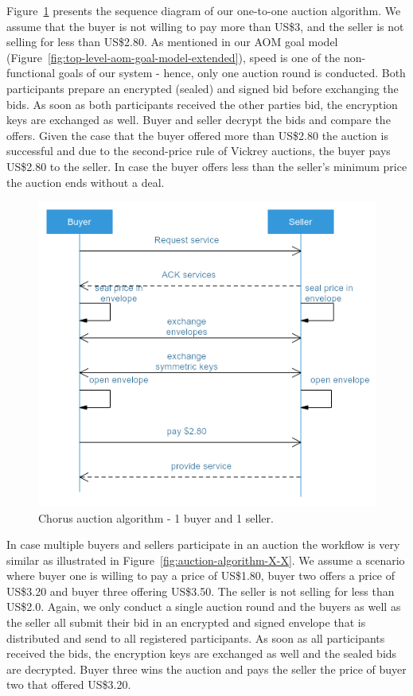 \documentclass{llncs}
\begin{document}
{			Figure~\ref{fig:auction-algorithm-1-1} presents the sequence diagram of our one-to-one auction algorithm. We assume that the buyer is not willing to pay more than US\$3, and the seller is not selling for less than US\$2.80. As mentioned in our AOM goal model (Figure~\ref{fig:top-level-aom-goal-model-extended}), speed is one of the non-functional goals of our system - hence, only one auction round is conducted.  Both participants prepare an encrypted (sealed) and signed bid before exchanging the bids. As soon as both participants received the other parties bid, the encryption keys are exchanged as well. Buyer and seller decrypt the bids and compare the offers. Given the case that the buyer offered more than US\$2.80 the auction is successful and due to the second-price rule of Vickrey auctions, the buyer pays US\$2.80 to the seller. In case the buyer offers less than the seller's minimum price the auction ends without a deal.	
			\begin{figure}
				\centering
				\includegraphics[scale=0.54]{Figures/auction/20180501_auction-aglorithms--1-to-1.png}
				\caption{Chorus auction algorithm - 1 buyer and 1 seller.}	
				\label{fig:auction-algorithm-1-1}
			\end{figure}
			In case multiple buyers and sellers participate in an auction the workflow is very similar as illustrated in Figure~\ref{fig:auction-algorithm-X-X}. We assume a scenario where buyer one is willing to pay a price of US\$1.80, buyer two offers a price of US\$3.20 and buyer three offering US\$3.50. The seller is not selling for less than US\$2.0. Again, we only conduct a single auction round and the buyers as well as the seller all submit their bid in an encrypted and signed envelope that is distributed and send to all registered participants. As soon as all participants received the bids, the encryption keys are exchanged as well and the sealed bids are decrypted. Buyer three wins the auction and pays the seller the price of buyer two that offered US\$3.20.
}
\end{document}

